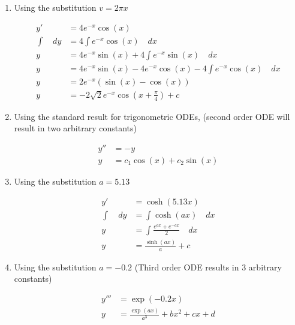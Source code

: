 \begin{enumerate}
    \item Using the substitution $v = 2 \pi x$

          \begin{align}
              y'            & = 4 e^{-x} \cos(x)                                                      \\
              \int \quad dy & = 4 \int e^{-x} \cos(x) \quad dx                                        \\
              y             & = 4 e^{-x} \sin(x)  + 4 \int e^{-x} \sin(x) \quad dx                    \\
              y             & = 4 e^{-x} \sin(x)  - 4 e^{-x} \cos(x) - 4 \int e^{-x} \cos(x) \quad dx \\
              y             & = 2 e^{-x} (\sin(x) - \cos(x))                                          \\
              y             & = -2 \sqrt{2} e^{-x} \cos\left(x + \frac{\pi}{4}\right) + c
          \end{align}


    \item Using the standard result for trigonometric ODEs, (second order ODE will result in two arbitrary constants)

          \begin{align}
              y'' & = -y                            \\
              y   & = c_{1} \cos(x) + c_{2} \sin(x)
          \end{align}


    \item Using the substitution $a  = 5.13$

          \begin{align}
              y'            & = \cosh(5.13 x)                             \\
              \int \quad dy & = \int \cosh(a x)  \quad dx                 \\
              y             & = \int \frac{e^{ax} + e^{-ax}}{2}  \quad dx \\
              y             & = \frac{\sinh(ax)}{a} + c
          \end{align}


    \item Using the substitution $a  = -0.2$ (Third order ODE results in 3 arbitrary constants)

          \begin{align}
              y''' & = \exp(-0.2x)                              \\
              y    & = \frac{\exp(ax)}{a^{3}} + bx^{2} + cx + d
          \end{align}



\end{enumerate}
